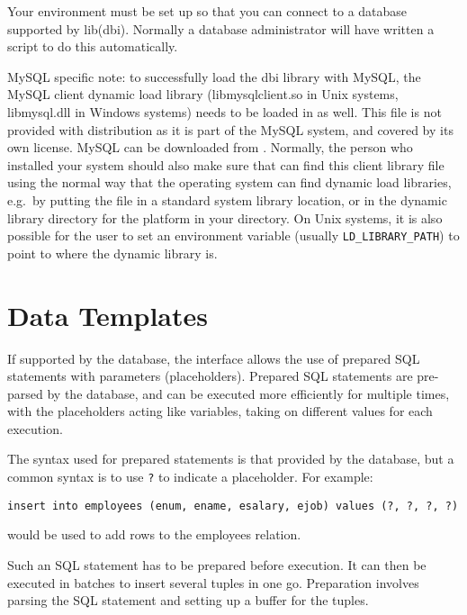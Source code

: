 Your environment must be set up so that you can connect to a
database supported by lib(dbi). Normally a database administrator will 
have written a script to do this automatically. 

MySQL specific note: to successfully load the dbi library with MySQL, the MySQL
client dynamic load library (libmysqlclient.so in Unix systems, libmysql.dll in
Windows systems) needs to be loaded in as well. This file is
not provided with {\eclipse} distribution as it is part of the MySQL
system, and covered by its own license. MySQL can be downloaded from 
.
Normally, the person who installed your {\eclipse} system should also make
sure that {\eclipse} can find this client library file using the normal way
that the operating system can find dynamic load libraries, e.g.\ by putting 
the file in a standard system
library location, or in the {\eclipse} dynamic library directory for the
platform in your {\eclipse} directory. On Unix systems, it is also possible
for the user to set an environment variable (usually {\tt LD_LIBRARY_PATH})
to point to where the dynamic library is.


\section{Data Templates}
\label{data-templates}

If supported by the database, the interface allows the use of
prepared SQL statements with parameters (placeholders). Prepared SQL
statements are pre-parsed by the database, and can be executed more
efficiently for multiple times, with the placeholders acting like variables,
taking on different values for each execution.

The syntax used for
prepared statements is that provided by the database, but a common syntax
is to use \verb'?' to indicate a placeholder. For example:
\begin{verbatim}
insert into employees (enum, ename, esalary, ejob) values (?, ?, ?, ?)
\end{verbatim}
would be used to add rows to the employees relation.

Such an SQL statement has to be prepared before execution. It can then
be executed in batches to insert several tuples in one go. Preparation
involves parsing the SQL statement and setting up a buffer for the tuples.

